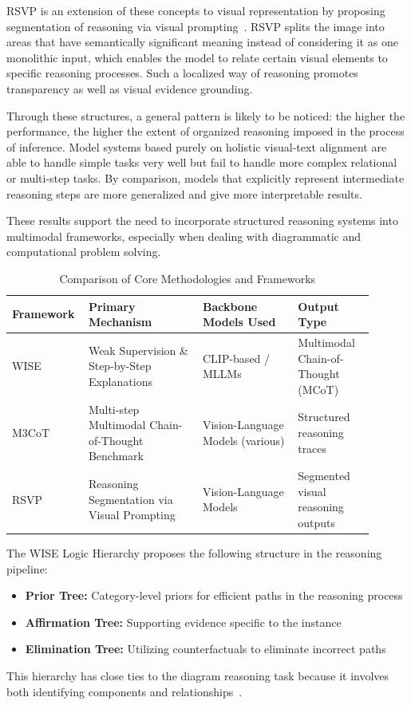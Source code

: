 \documentclass[sigconf, nonacm]{acmart}
\begin{document}
RSVP is an extension of these concepts to visual representation by proposing 
segmentation of reasoning via visual prompting~\cite{lu2025rsvp}. RSVP splits 
the image into areas that have semantically significant meaning instead of 
considering it as one monolithic input, which enables the model to relate 
certain visual elements to specific reasoning processes. Such a localized way 
of reasoning promotes transparency as well as visual evidence grounding.

Through these structures, a general pattern is likely to be noticed: the 
higher the performance, the higher the extent of organized reasoning imposed 
in the process of inference. Model systems based purely on holistic visual-text 
alignment are able to handle simple tasks very well but fail to handle more 
complex relational or multi-step tasks. By comparison, models that explicitly 
represent intermediate reasoning steps are more generalized and give more 
interpretable results.

These results support the need to incorporate structured reasoning systems 
into multimodal frameworks, especially when dealing with diagrammatic and 
computational problem solving.

\begin{table}
\caption{Comparison of Core Methodologies and Frameworks}
\label{tab:methodologies}
\begin{tabular}{p{0.15\linewidth} p{0.3\linewidth} p{0.25\linewidth} p{0.2\linewidth}}
\toprule
\textbf{Framework} & \textbf{Primary Mechanism} & \textbf{Backbone Models Used} & \textbf{Output Type} \\
\midrule
WISE~\cite{jiang2025wise} & Weak Supervision \& Step-by-Step Explanations & CLIP-based / MLLMs & Multimodal Chain-of-Thought (MCoT) \\
M3CoT~\cite{chen2024m3cot} & Multi-step Multimodal Chain-of-Thought Benchmark & Vision-Language Models (various) & Structured reasoning traces \\
RSVP~\cite{lu2025rsvp} & Reasoning Segmentation via Visual Prompting & Vision-Language Models & Segmented visual reasoning outputs \\
\bottomrule
\end{tabular}
\end{table}

The WISE Logic Hierarchy proposes the following structure in the reasoning pipeline:
\begin{itemize}
    \item \textbf{Prior Tree:} Category-level priors for efficient paths in the reasoning process
    \item \textbf{Affirmation Tree:} Supporting evidence specific to the instance
    \item \textbf{Elimination Tree:} Utilizing counterfactuals to eliminate incorrect paths
\end{itemize}
This hierarchy has close ties to the diagram reasoning task because it involves 
both identifying components and relationships~\cite{jiang2025wise}.
\end{document}
